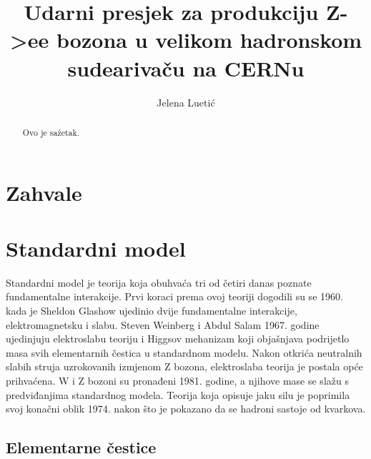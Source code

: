 \documentclass[a4paper,12pt]{report}
\begin{document}
\title{Udarni presjek za produkciju Z->ee bozona u velikom hadronskom sudearivaču na CERNu}
\author{Jelena Luetić}



\tableofcontents
\listoffigures
\listoftables

\chapter*{Zahvale}

\begin{abstract}
Ovo je sažetak.
\end{abstract}



\chapter{Standardni model}
\label{sec:StandardniModel}

Standardni model je teorija koja obuhvaća tri od četiri danas poznate fundamentalne interakcije. Prvi koraci prema ovoj teoriji dogodili su se 1960. kada je Sheldon Glashow ujedinio dvije fundamentalne interakcije, elektromagnetsku i slabu. Steven Weinberg i Abdul Salam 1967. godine ujedinjuju elektroslabu teoriju i Higgsov mehanizam koji objašnjava podrijetlo masa svih elementarnih čestica u standardnom modelu. Nakon otkrića neutralnih slabih struja uzrokovanih izmjenom Z bozona, elektroslaba teorija je postala opće prihvaćena. W i Z bozoni su pronađeni 1981. godine, a njihove mase se slažu s predviđanjima standardnog modela. Teorija koja opisuje jaku silu je poprimila svoj konačni oblik 1974. nakon što je pokazano da se hadroni sastoje od kvarkova.

\section{Elementarne čestice}
\end{document}
